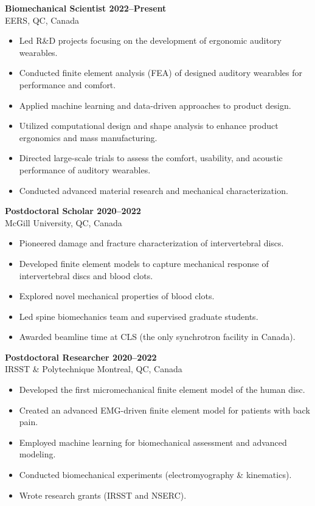 \documentclass[11pt,a4paper]{article}
\begin{document}
\textbf{Biomechanical Scientist \hfill 2022--Present} \\
EERS, QC, Canada
\begin{itemize}[leftmargin=*, label={}]
    \item Led R\&D projects focusing on the development of ergonomic auditory wearables.
    \item Conducted finite element analysis (FEA) of designed auditory wearables for performance and comfort.
    \item Applied machine learning and data-driven approaches to product design.
    \item Utilized computational design and shape analysis to enhance product ergonomics and mass manufacturing.
    \item Directed large-scale trials to assess the comfort, usability, and acoustic performance of auditory wearables.
    \item Conducted advanced material research and mechanical characterization.
\end{itemize}

\textbf{Postdoctoral Scholar \hfill 2020--2022} \\
McGill University, QC, Canada
\begin{itemize}[leftmargin=*, label={}]
    \item Pioneered damage and fracture characterization of intervertebral discs.
    \item Developed finite element models to capture mechanical response of intervertebral discs and blood clots.
    \item Explored novel mechanical properties of blood clots.
    \item Led spine biomechanics team and supervised graduate students.
    \item Awarded beamline time at CLS (the only synchrotron facility in Canada).
\end{itemize}

\textbf{Postdoctoral Researcher \hfill 2020--2022} \\
IRSST \& Polytechnique Montreal, QC, Canada
\begin{itemize}[leftmargin=*, label={}]
    \item Developed the first micromechanical finite element model of the human disc.
    \item Created an advanced EMG-driven finite element model for patients with back pain.
    \item Employed machine learning for biomechanical assessment and advanced modeling.
    \item Conducted biomechanical experiments (electromyography \& kinematics).
    \item Wrote research grants (IRSST and NSERC).
\end{itemize}
\end{document}
